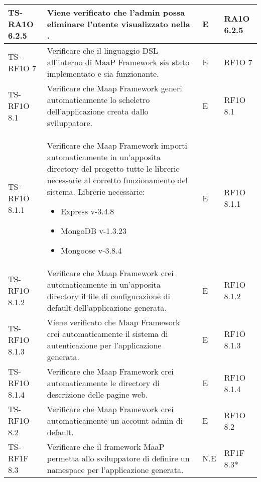 \begin{center}
\begin{longtable}{| p{3cm} | p{6cm} | p{1.5cm} | p{2cm} | }
				TS-RA1O 6.2.5 & 
				Viene verificato che l'admin possa eliminare l'utente visualizzato nella \glossario{show-page}. & E & RA1O 6.2.5 \newline  \\ \hline 
				TS-RF1O 7 & 
				Verificare che il linguaggio DSL all'interno di MaaP Framework sia stato implementato e sia funzionante. & E & RF1O 7 \newline  \\ \hline 
				TS-RF1O 8.1  & 
				Verificare che Maap Framework generi automaticamente lo scheletro dell’applicazione creata dallo sviluppatore. & E & RF1O 8.1  \newline  \\ \hline 
				TS-RF1O 8.1.1 & 
				Verificare che Maap Framework importi automaticamente in un'apposita directory del progetto tutte le librerie necessarie al corretto funzionamento del sistema. Librerie necessarie: \begin{itemize} \item Express v-3.4.8 \item MongoDB v-1.3.23 \item Mongoose v-3.8.4 \end{itemize} & E & RF1O 8.1.1 \newline  \\ \hline 
				TS-RF1O 8.1.2 & 
				Verificare che Maap Framework crei automaticamente in un’apposita directory il file di configurazione di default dell’applicazione generata. & E & RF1O 8.1.2 \newline  \\ \hline 
				TS-RF1O 8.1.3 & 
				Viene verificato che Maap Framework crei automaticamente il sistema di autenticazione per l’applicazione generata. & E & RF1O 8.1.3 \newline  \\ \hline 
				TS-RF1O 8.1.4 & 
				Verificare che Maap Framework crei automaticamente le directory di descrizione delle pagine web. & E & RF1O 8.1.4 \newline  \\ \hline 
				TS-RF1O 8.2 & 
				Verificare che Maap Framework crei automaticamente un account admin di default. & E & RF1O 8.2 \newline  \\ \hline 
				TS-RF1F 8.3 & 
				Verificare che il framework MaaP permetta allo sviluppatore di definire un namespace per l’applicazione generata. & N.E & RF1F 8.3*  \newline  \\ \hline 

\end{longtable}
\end{center}
